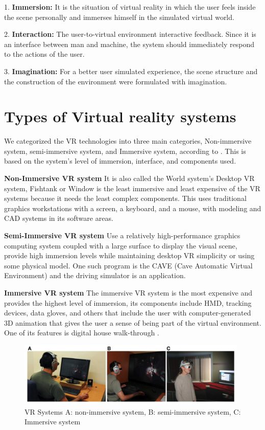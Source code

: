 1. \textbf{Immersion:} It is the situation of virtual reality in which the user feels inside the scene personally and immerses himself in the simulated virtual world.



2. \textbf{Interaction:} The user-to-virtual environment interactive feedback. Since it is an interface between man and machine, the system should immediately respond to the actions of the user.




3. \textbf{Imagination:} For a better user simulated experience, the scene structure and the construction of the environment were formulated with imagination.

\section{Types of Virtual reality systems}
We categorized the VR technologies into three main categories, Non-immersive system, semi-immersive system, and Immersive system, according to \cite{Bamodu2013VirtualComponents}. This is based on the system's level of immersion, interface, and components used.  

\textbf{Non-Immersive VR system}
It is also called the World system's Desktop VR system, Fishtank or Window is the least immersive and least expensive of the VR systems because it needs the least complex components. This uses traditional graphics workstations with a screen, a keyboard, and a mouse, with modeling and CAD systems in its software areas.  

\textbf{Semi-Immersive VR system}
Use a relatively high-performance graphics computing system coupled with a large surface to display the visual scene, provide high immersion levels while maintaining desktop VR simplicity or using some physical model. One such program is the CAVE (Cave Automatic Virtual Environment) and the driving simulator is an application. 

\textbf{Immersive VR system}
 The immersive VR system is the most expensive and provides the highest level of immersion, its components include HMD, tracking devices, data gloves, and others that include the user with computer-generated 3D animation that gives the user a sense of being part of the virtual environment. One of its features is digital house walk-through \citep{Bamodu2013VirtualComponents, Baus2014MovingReview}.

\begin{figure}[ht]
    \centering
    \includegraphics[width=0.98\textwidth]{images/vrsystem.png}
    \caption{VR Systems A: non-immersive system, B: semi-immersive system, C: Immersive system \citep{Baus2014MovingReview}}
    \label{fig:vrsys}
\end{figure}




